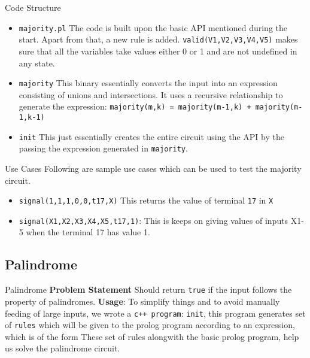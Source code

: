 \documentclass{beamer}
\begin{document}
\begin{frame}{Code Structure}
\begin{itemize}
\item\texttt{majority.pl}
\newline
The code is built upon the basic API mentioned during the start.
Apart from that, a new rule is added.
\newline
\texttt{valid(V1,V2,V3,V4,V5)} makes sure that all the variables take values either 0 or 1 and are not undefined in any state.
\item \texttt{majority} \newline This binary essentially converts the input into an expression consisting of unions and intersections.
\newline It uses a recursive relationship to generate the expression:
\texttt{majority(m,k) = majority(m-1,k) + majority(m-1,k-1)}
\item \texttt{init}  \newline
This just essentially creates the entire circuit using the API by the passing the expression generated in \texttt{majority}.
\end{itemize}

\end{frame}


\begin{frame}{Use Cases}
Following are sample use cases which can be used to test the majority circuit.
\newline
\begin{itemize}
\item \texttt{signal(1,1,1,0,0,t17,X)} This returns the value of terminal \texttt{17} in \texttt{X}
\item \texttt{signal(X1,X2,X3,X4,X5,t17,1)}: This is keeps on giving values of inputs X1-5 when the terminal 17 has value 1.
\end{itemize}
\end{frame}


\subsection{Palindrome}
\begin{frame}{Palindrome}
\textbf{Problem Statement} Should return \texttt{true} if the input follows the property of palindromes.
\newline \newline
\textbf{Usage}: 
To simplify things and to avoid manually feeding of large inputs, we wrote a \texttt{c++ program}: \texttt{init}, this program generates set of \texttt{rules} which will be given to the prolog program according to an expression, which is of the form 
These set of rules alongwith the basic prolog program, help us solve the palindrome circuit.
\end{frame}
\end{document}
